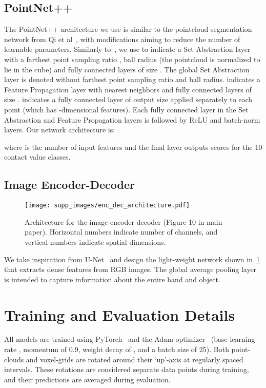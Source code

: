 \documentclass[runningheads]{llncs}
\begin{document}
\subsection{PointNet++}
The PointNet++ architecture we use is similar to the pointcloud segmentation network from Qi et al~\cite{qi2017pointnet++}, with modifications aiming to reduce the number of learnable parameters. Similarly to~\cite{qi2017pointnet++}, we use  to indicate a Set Abstraction layer with a farthest point sampling ratio , ball radius  (the pointcloud is normalized to lie in the  cube) and  fully connected layers of size . The global Set Abstraction layer is denoted without farthest point sampling ratio and ball radius.  indicates a Feature Propagation layer with  nearest neighbors and  fully connected layers of size .  indicates a fully connected layer of output size  applied separately to each point (which has -dimensional features). Each fully connected layer in the Set Abstraction and Feature Propagation layers is followed by ReLU and batch-norm layers. Our network architecture is:

where  is the number of input features and the final layer outputs scores for the 10 contact value classes.

\subsection{Image Encoder-Decoder}
\begin{figure}
  \texttt{[image: supp\_images/enc\_dec\_architecture.pdf]}
  \caption{Architecture for the image encoder-decoder (Figure 10 in main paper). Horizontal numbers indicate number of channels, and vertical numbers indicate spatial dimensions.}
  \label{fig:enc_dec_architecture}
\end{figure}
We take inspiration from U-Net~\cite{ronneberger2015unet} and design the light-weight network shown in~\ref{fig:enc_dec_architecture} that extracts dense features from RGB images. The global average pooling layer is intended to capture information about the entire hand and object.

\section{Training and Evaluation Details}
All models are trained using PyTorch~\cite{paszke2017automatic} and the Adam optimizer~\cite{kingma2014adam} (base learning rate , momentum of 0.9, weight decay of , and a batch size of 25). Both point-clouds and voxel-grids are rotated around their `up'-axis at regularly spaced  intervals. These rotations are considered separate data points during training, and their predictions are averaged during evaluation.
\end{document}
